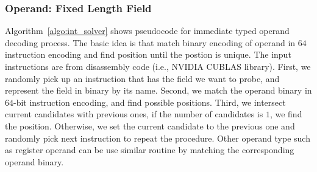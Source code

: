 

\subsubsection{Operand: Fixed Length Field}
Algorithm~\ref{algo:int_solver} shows pseudocode for immediate typed operand decoding process. 
The basic idea is that match binary encoding of operand in $64$ instruction encoding and find
position until the postion is unique. The input instructions are from disassembly code (i.e., NVIDIA CUBLAS library).
First, we randomly pick up an instruction that has the field we want to probe, and represent the field in binary by its 
name. Second, we match the operand binary in $64$-bit instruction encoding, and find possible positions. Third, we 
intersect current candidates with previous ones, if the number of candidates is $1$, we find the position. Otherwise, 
we set the current candidate to the previous one and randomly pick next instruction to repeat the procedure.
Other operand type such as register operand can be use similar routine by matching the corresponding operand binary.


